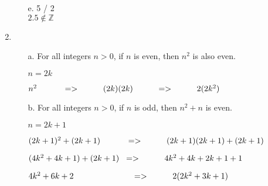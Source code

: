 \begin{enumerate}
\begin{enumerate}
                \item[e.] 5 / 2 \\ $2.5 \not\in \mathbb{Z}$ 
            \end{enumerate}

        \item
            \begin{enumerate}
                \item[a.] For all integers $n > 0$, if $n$ is even, then $n^{2}$ is also even.

                    $n = 2k$

                    $n^{2}    \tab[1.1cm] => \tab (2k)(2k)  \tab => \tab    2(2k^{2})$


                \item[b.] For all integers $n > 0$, if $n$ is odd, then $n^{2} + n$ is even.

                    $n = 2k+1$

                    $(2k+1)^{2} + (2k+1)    \tab[1.1cm] => \tab (2k+1)(2k+1) + (2k+1)$

                    $(4k^{2} + 4k + 1) + (2k + 1) \tab[0.2cm] => \tab 4k^{2} + 4k + 2k + 1 + 1$

                    $4k^{2} + 6k + 2 \tab[2.5cm] => \tab 2(2k^{2} + 3k + 1)$
            \end{enumerate}
    \end{enumerate}




